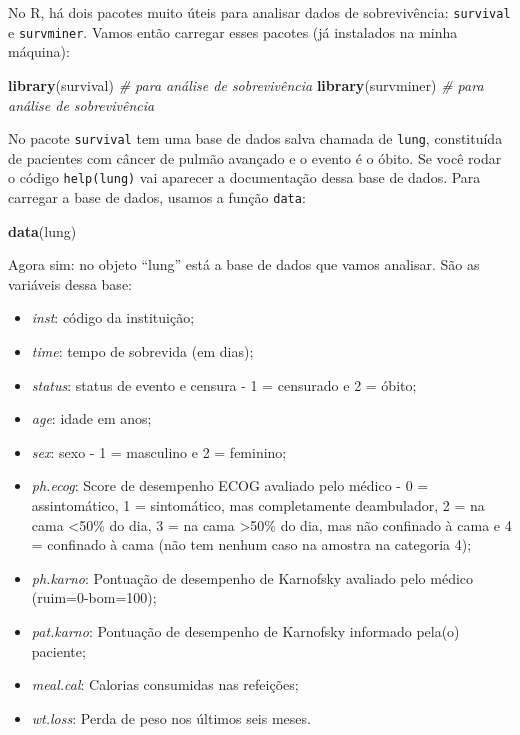 \documentclass[
]{book}
\newenvironment{Shaded}{\begin{snugshade}}{\end{snugshade}}
\newcommand{\CommentTok}[1]{\textcolor[rgb]{0.56,0.35,0.01}{\textit{#1}}}
\newcommand{\KeywordTok}[1]{\textcolor[rgb]{0.13,0.29,0.53}{\textbf{#1}}}
\newcommand{\NormalTok}[1]{#1}
\begin{document}
No R, há dois pacotes muito úteis para analisar dados de sobrevivência: \texttt{survival} e \texttt{survminer}. Vamos então carregar esses pacotes (já instalados na minha máquina):

\begin{Shaded}
\begin{Highlighting}[]
\KeywordTok{library}\NormalTok{(survival) }\CommentTok{# para análise de sobrevivência}
\KeywordTok{library}\NormalTok{(survminer) }\CommentTok{# para análise de sobrevivência}
\end{Highlighting}
\end{Shaded}

No pacote \texttt{survival} tem uma base de dados salva chamada de \texttt{lung}, constituída de pacientes com câncer de pulmão avançado e o evento é o óbito. Se você rodar o código \texttt{help(lung)} vai aparecer a documentação dessa base de dados. Para carregar a base de dados, usamos a função \texttt{data}:

\begin{Shaded}
\begin{Highlighting}[]
\KeywordTok{data}\NormalTok{(lung)}
\end{Highlighting}
\end{Shaded}

Agora sim: no objeto ``lung'' está a base de dados que vamos analisar. São as variáveis dessa base:

\begin{itemize}
\item
  \emph{inst}: código da instituição;
\item
  \emph{time}: tempo de sobrevida (em dias);
\item
  \emph{status}: status de evento e censura - 1 = censurado e 2 = óbito;
\item
  \emph{age}: idade em anos;
\item
  \emph{sex}: sexo - 1 = masculino e 2 = feminino;
\item
  \emph{ph.ecog}: Score de desempenho ECOG avaliado pelo médico - 0 = assintomático, 1 = sintomático, mas completamente deambulador, 2 = na cama \textless50\% do dia, 3 = na cama \textgreater50\% do dia, mas não confinado à cama e 4 = confinado à cama (não tem nenhum caso na amostra na categoria 4);
\item
  \emph{ph.karno}: Pontuação de desempenho de Karnofsky avaliado pelo médico (ruim=0-bom=100);
\item
  \emph{pat.karno}: Pontuação de desempenho de Karnofsky informado pela(o) paciente;
\item
  \emph{meal.cal}: Calorias consumidas nas refeições;
\item
  \emph{wt.loss}: Perda de peso nos últimos seis meses.
\end{itemize}
\end{document}
